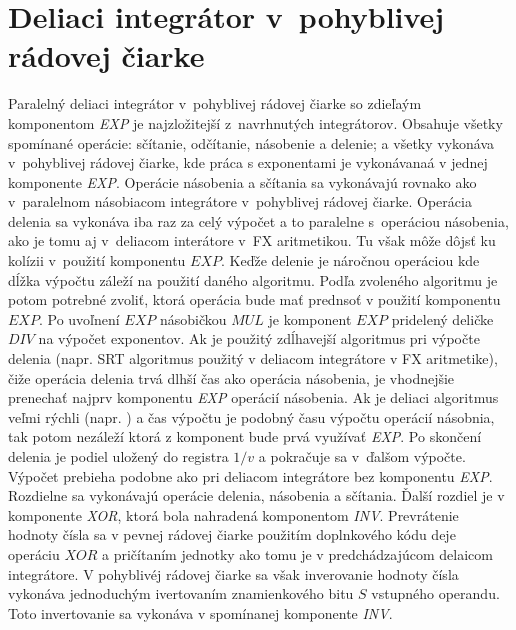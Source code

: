 \section{Deliaci integrátor v~pohyblivej rádovej čiarke}
Paralelný deliaci integrátor v~pohyblivej rádovej čiarke so zdieľaým komponentom \textit{EXP} je najzložitejší z~navrhnutých integrátorov. Obsahuje všetky spomínané operácie: sčítanie, odčítanie, násobenie a delenie; a všetky vykonáva v~pohyblivej rádovej čiarke, kde práca s exponentami je vykonávanaá v jednej komponente \textit{EXP}.
Operácie násobenia a sčítania sa vykonávajú rovnako ako v~paralelnom násobiacom integrátore v~pohyblivej rádovej čiarke. Operácia delenia sa vykonáva iba raz za celý výpočet a to paralelne s~operáciou násobenia, ako je tomu aj v~deliacom interátore v~FX aritmetikou. Tu však môže dôjsť ku kolízii v~použití komponentu $ EXP $. Keďže delenie je náročnou operáciou kde dĺžka výpočtu záleží na použití daného algoritmu. Podľa zvoleného algoritmu je potom potrebné zvoliť, ktorá operácia bude mať prednsoť v použití komponentu $ EXP $. Po uvoľnení $ EXP $ násobičkou $ MUL $ je komponent $ EXP $ pridelený deličke $ DIV $ na výpočet exponentov. Ak je použitý zdĺhavejší algoritmus pri výpočte delenia (napr. SRT algoritmus použitý v deliacom integrátore v FX aritmetike), čiže operácia delenia trvá dlhší čas ako  operácia násobenia, je vhodnejšie prenechať najprv komponentu \textit{EXP} operácií násobenia. Ak je deliaci algoritmus veľmi rýchli (napr. ) a čas výpočtu je podobný času výpočtu operácií násobnia, tak potom nezáleží ktorá z komponent bude prvá využívať \textit{EXP}. Po skončení delenia je podiel uložený do registra $ 1/v $ a pokračuje sa v~ďalšom výpočte.
Výpočet prebieha podobne ako pri deliacom integrátore bez komponentu \textit{EXP}. Rozdielne sa vykonávajú operácie delenia, násobenia a sčítania. Ďalší rozdiel je v komponente \textit{XOR}, ktorá bola nahradená komponentom \textit{INV}. Prevrátenie hodnoty čísla sa v pevnej rádovej čiarke použitím doplnkového kódu deje operáciu $ XOR $ a pričítaním jednotky ako tomu je v predchádzajúcom delaicom integrátore. V pohyblivéj rádovej čiarke sa však inverovanie hodnoty čísla vykonáva jednoduchým ivertovaním znamienkového bitu $ S $ vstupného operandu. Toto invertovanie sa vykonáva v spomínanej komponente \textit{INV}.

